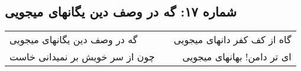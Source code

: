 \begin{center}
\section*{شماره ۱۷: گه در وصف دین یگانهای میجویی}
\label{sec:017}
\begin{longtable}{l p{0.5cm} r}
گه در وصف دین یگانهای میجویی
&&
گاه از کف کفر دانهای میجویی
\\
چون از سر خویش بر نمیدانی خاست
&&
ای تر دامن! بهانهای میجویی
\\
\end{longtable}
\end{center}
